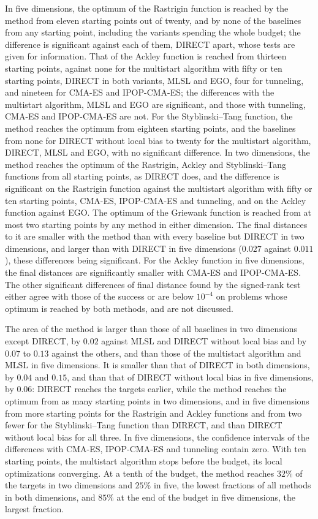 \documentclass[pdflatex,sn-basic]{sn-jnl}
\begin{document}
In five dimensions, the optimum of the Rastrigin function is reached by the
method from eleven starting points out of twenty, and by none of the baselines
from any starting point, including the variants spending the whole budget; the
difference is significant against each of them, DIRECT apart, whose tests are
given for information. That of the Ackley function is reached from thirteen
starting points, against none for the multistart algorithm with fifty or ten
starting points, DIRECT in both variants, MLSL and EGO, four for tunneling, and
nineteen for CMA-ES and IPOP-CMA-ES; the differences with the multistart
algorithm, MLSL and EGO are significant, and those with tunneling, CMA-ES and
IPOP-CMA-ES are not. For the Styblinski--Tang function, the method reaches the
optimum from eighteen starting points, and the baselines from none for DIRECT
without local bias to twenty for the multistart algorithm, DIRECT, MLSL and EGO,
with no significant difference. In two dimensions, the method reaches the
optimum of the Rastrigin, Ackley and Styblinski--Tang functions from all
starting points, as DIRECT does, and the difference is significant on the
Rastrigin function against the multistart algorithm with fifty or ten starting
points, CMA-ES, IPOP-CMA-ES and tunneling, and on the Ackley function against
EGO. The optimum of the Griewank function is reached from at most two starting
points by any method in either dimension. The final distances to it are smaller
with the method than with every baseline but DIRECT in two dimensions, and
larger than with DIRECT in five dimensions ($0.027$ against $0.011$), these
differences being significant. For the Ackley function in five dimensions, the
final distances are significantly smaller with CMA-ES and IPOP-CMA-ES. The
other significant differences of final distance found by the signed-rank test
either agree with those of the success or are below $10^{-4}$ on problems whose
optimum is reached by both methods, and are not discussed.

The area of the method is larger than those of all baselines in two dimensions
except DIRECT, by $0.02$ against MLSL and DIRECT without local bias and by
$0.07$ to $0.13$ against the others, and than those of the multistart algorithm
and MLSL in five dimensions. It is smaller than that of DIRECT in both
dimensions, by $0.04$ and $0.15$, and than that of DIRECT without local bias in
five dimensions, by $0.06$: DIRECT reaches the targets earlier, while the
method reaches the optimum from as many starting points in two dimensions, and
in five dimensions from more starting points for the Rastrigin and Ackley
functions and from two fewer for the Styblinski--Tang function than DIRECT, and
than DIRECT without local bias for all three. In five dimensions, the
confidence intervals of the differences with CMA-ES, IPOP-CMA-ES and tunneling
contain zero. With ten starting points, the multistart algorithm stops before
the budget, its local optimizations converging. At a tenth of the budget, the
method reaches $32\%$ of the targets in two dimensions and $25\%$ in five, the
lowest fractions of all methods in both dimensions, and $85\%$ at the end of the
budget in five dimensions, the largest fraction.
\end{document}
